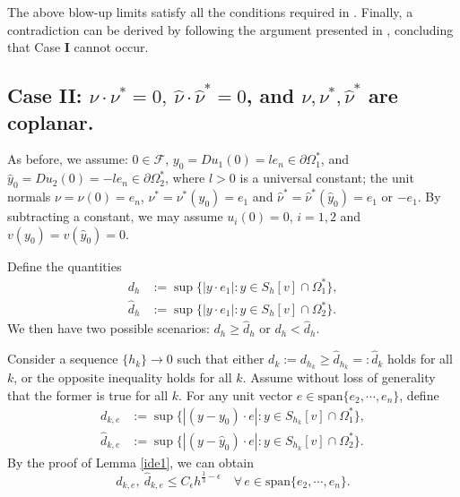 \documentclass[11pt]{amsart}
\theoremstyle{plain}
\newcommand{\0}{\textbf{0}}
\numberwithin{equation}{section}
\numberwithin{equation}{section}
\numberwithin{figure}{section}
\begin{document}
The above blow-up limits satisfy all the conditions required in \cite[Proposition 5.1 (ii)]{CLW3}.
Finally, a contradiction can be derived by following the argument presented in \cite[Section 6.2]{CLW3}, concluding that Case \textbf{I} cannot occur.



\subsection{Case \textbf{II}: $\nu\cdot \nu^*=0,\ \hat\nu \cdot \hat\nu^* = 0$, and $\nu, \nu^*, \hat\nu^*$ are coplanar.}

As before, we assume:
\(0 \in \mathcal{F}\), \(y_0 = Du_1(0) = le_n \in \partial\Omega^*_1\), and \(\hat{y}_0 = Du_2(0) = -le_n \in \partial\Omega^*_2\), where \(l>0\) is a universal constant;
the unit normals \(\nu = \nu(0) = e_n\), \(\nu^* = \nu^*(y_0) = e_1\) and \(\hat{\nu}^* = \hat{\nu}^*(\hat{y}_0) = e_1\) or \(-e_1\). By subtracting a constant, we may assume $u_i(0)=0$, $i=1, 2$ and $v(y_0)=v(\hat y_0)=0.$
 
Define the quantities
\begin{align*}
d_h &:= \sup\{|y\cdot e_1| : y\in S_h[v]\cap \Omega_1^*\}, \\
\hat{d}_h &:= \sup\{|y\cdot e_1| : y\in S_h[v]\cap \Omega_2^*\}.
\end{align*}
We then have two possible scenarios: $d_h\geq \hat{d}_h$ or $d_h<\hat{d}_h$.

Consider a sequence $\{h_k\}\rightarrow 0$ such that either $d_k:=d_{h_k}\geq \hat{d}_{h_k}=:\hat d_k$ holds for all $k$, or the opposite inequality holds for all $k$. Assume without loss of generality that the former is true for all $k$. 
For any unit vector $e\in \text{span}\{e_2, \cdots, e_n\}$, define
\begin{align*}
d_{k,e} &:= \sup\{|(y-y_0)\cdot e| : y\in S_{h_k}[v]\cap \Omega_1^*\}, \\
\hat{d}_{k,e} &:= \sup\{|(y-\hat y_0)\cdot e| : y\in S_{h_k}[v]\cap \Omega_2^*\}.
\end{align*}
By the proof of Lemma \ref{ide1}, we can obtain 
\begin{equation}\label{estwid1}
d_{k, e},\ \hat{d}_{k, e} \leq C_{\epsilon}h^{\frac{1}{3}-\epsilon} \quad \forall\, e\in \text{span}\{e_2, \cdots, e_n\}.
\end{equation}
\end{document}
